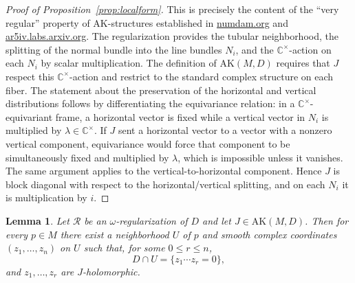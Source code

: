 \documentclass[11pt]{article}
\newtheorem{lemma}[theorem]{Lemma}
\begin{document}
\begin{proof}[Proof of Proposition~\ref{prop:localform}]
This is precisely the content of the ``very regular'' property of $\mathrm{AK}$-structures established in \href{https://www.numdam.org/item/10.1016/j.crma.2018.02.009.pdf}{numdam.org} and \href{https://ar5iv.labs.arxiv.org/html/2112.13125}{ar5iv.labs.arxiv.org}. The regularization provides the tubular neighborhood, the splitting of the normal bundle into the line bundles $N_i$, and the $\mathbb C^\times$-action on each $N_i$ by scalar multiplication. The definition of $\mathrm{AK}(M,D)$ requires that $J$ respect this $\mathbb C^\times$-action and restrict to the standard complex structure on each fiber. The statement about the preservation of the horizontal and vertical distributions follows by differentiating the equivariance relation: in a $\mathbb C^\times$-equivariant frame, a horizontal vector is fixed while a vertical vector in $N_i$ is multiplied by $\lambda\in\mathbb C^\times$. If $J$ sent a horizontal vector to a vector with a nonzero vertical component, equivariance would force that component to be simultaneously fixed and multiplied by $\lambda$, which is impossible unless it vanishes. The same argument applies to the vertical-to-horizontal component. Hence $J$ is block diagonal with respect to the horizontal/vertical splitting, and on each $N_i$ it is multiplication by $i$.
\end{proof}

\begin{lemma}\label{lem:coordinates}
Let $\mathcal R$ be an $\omega$-regularization of $D$ and let $J\in\mathrm{AK}(M,D)$. Then for every $p\in M$ there exist a neighborhood $U$ of $p$ and smooth complex coordinates $(z_1,\dots,z_n)$ on $U$ such that, for some $0\le r\le n$,
\[
D\cap U=\{z_1\cdots z_r=0\},
\]
and $z_1,\dots,z_r$ are $J$-holomorphic.
\end{lemma}
\end{document}
